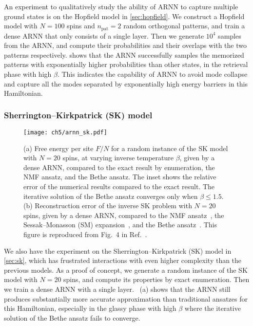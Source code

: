 An experiment to qualitatively study the ability of ARNN to capture multiple ground states is on the Hopfield model in \cref{sec:hopfield}. We construct a Hopfield model with $N = 100$ spins and $n_\text{pat} = 2$ random orthogonal patterns, and train a dense ARNN that only consists of a single layer. Then we generate $10^4$ samples from the ARNN, and compute their probabilities and their overlaps with the two patterns respectively.  shows that the ARNN successfully samples the memorized patterns with exponentially higher probabilities than other states, in the retrieval phase with high $\beta$. This indicates the capability of ARNN to avoid mode collapse and capture all the modes separated by exponentially high energy barriers in this Hamiltonian.

\subsubsection{Sherrington--Kirkpatrick (SK) model}

\begin{figure}[htb]
\centering
\texttt{[image: ch5/arnn\_sk.pdf]}
\caption[ARNN results of Sherrington--Kirkpatrick (SK) model and inverse SK problem]{
(a) Free energy per site $F / N$ for a random instance of the SK model with $N = 20$ spins, at varying inverse temperature $\beta$, given by a dense ARNN, compared to the exact result by enumeration, the NMF ansatz, and the Bethe ansatz. The inset shows the relative error of the numerical results compared to the exact result.
The iterative solution of the Bethe ansatz converges only when $\beta \le 1.5$. \\
(b) Reconstruction error of the inverse SK problem with $N = 20$ spins, given by a dense ARNN, compared to the NMF ansatz~\cite{roudi2009ising}, the Sessak--Monasson (SM) expansion~\cite{sessak2009small}, and the Bethe ansatz~\cite{ricci2012bethe}.
This figure is reproduced from Fig.~4 in Ref.~\cite{wu2019solving}.
}
\label{fig:arnn-sk}
\end{figure}

We also have the experiment on the Sherrington--Kirkpatrick (SK) model in \cref{sec:sk}, which has frustrated interactions with even higher complexity than the previous models. As a proof of concept, we generate a random instance of the SK model with $N = 20$ spins, and compute its properties by exact enumeration. Then we train a dense ARNN with a single layer. ~(a) shows that the ARNN still produces substantially more accurate approximation than traditional ansatzes for this Hamiltonian, especially in the glassy phase with high $\beta$ where the iterative solution of the Bethe ansatz fails to converge.

